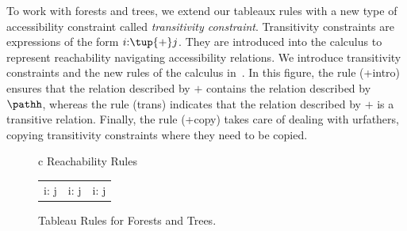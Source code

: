 \documentclass[10pt,a4paper]{amsart}
\theoremstyle{definition}
\theoremstyle{remark}
\begin{document}
To work with forests and trees, we extend our tableaux rules with a new type of accessibility constraint called {\em transitivity constraint}.
Transitivity constraints are expressions of the form $i{:}\tup{+} j$.
They are introduced into the calculus to represent reachability navigating accessibility relations.
We introduce transitivity constraints and the new rules of the calculus in~.  
In this figure, the rule (+intro) ensures that the relation described by ${+}$ contains the relation described by ${\pathh}$, whereas the rule (trans) indicates that the relation described by ${+}$ is a transitive relation.
Finally, the rule (+copy) takes care of dealing with urfathers, copying transitivity constraints where they need to be copied.
 
\begin{figure}[t]%
    \begin{center}
        \small 
        {\def\arraystretch{1.2}
        \begin{tabular}{c}
            \toprule
            {\sc Reachability Rules}
            \tabularnewline
            \midrule
            {
            \begin{tabular}{ccc}
                {\infer[(+\mathrm{intro})]
                { i{:}\tup{+} j}
                { i{:}\tup{\pathh} j}
                }
                &
                {\infer[(\mathrm{trans})]
                    {i{:} \tup{+} k}
                    {\deduce[]
                    { j{:}\tup{+} k}
                    {i{:}\tup{+} j} 
                    }
                }
                &
                {\infer[(+\mathrm{copy})]
                    {i{:}\tup{+} k}
                    {\deduce[]
                    {\phantom{|} j{:}k} 
                    {\phantom{|} i{:}\tup{\pathh} j}}
                }
            \end{tabular}
            }
            \tabularnewline
            \bottomrule                        
        \end{tabular}}
    \end{center}
    \caption{Tableau Rules for Forests and Trees.}
    \label{rules:reachability}
\end{figure}
\end{document}
